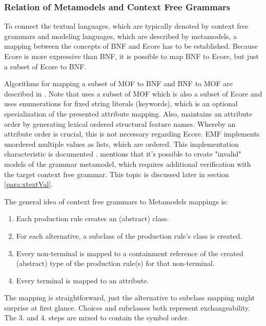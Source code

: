 

\subsubsection{Relation of Metamodels and Context Free Grammars} \label{sec:MM:CFGs}
To connect the textual languages, which are typically denoted by context free grammars and modeling languages, which are described by metamodels, a mapping between the concepts of BNF and Ecore has to be established. Because Ecore is more expressive than BNF, it is possible to map BNF to Ecore, but just a subset of Ecore to BNF.

Algorithms for mapping a subset of MOF to BNF and BNF to MOF are described in \cite{MofCfg}. Note that \cite{MofCfg} uses a subset of MOF which is also a subset of Ecore and uses enumerations for fixed string literals (keywords), which is an optional specialization of the presented attribute mapping. Also,  \cite{MofCfg} maintains an attribute order by generating lexical ordered structural feature names. Whereby an attribute order is crucial, this is not necessary regarding Ecore. EMF implements unordered multiple values as lists, which are ordered. This implementation characteristic is documented \cite{EMF2nd}.  \cite{MofCfg} mentions that it's possible to create "invalid" models of the grammar metamodel, which requires additional verification with the target context free grammar. This topic is discussed later in section \ref{para:xtextVal}.

The general idea of context free grammars to Metamodels mappings is:
\begin{enumerate}
	\item Each production rule creates an (abstract) class.
	\item For each alternative,  a subclass of the production rule's class is created.
	\item Every non-terminal is mapped to a containment reference of the created (abstract) type of the production rule(s) for that non-terminal.
	\item Every terminal is mapped to an attribute.
\end{enumerate}

The mapping is straightforward, just the alternative to subclass mapping might surprise at first glance. Choices and subclasses both represent exchangeability. The 3. and 4. steps are mixed to contain the symbol order.

